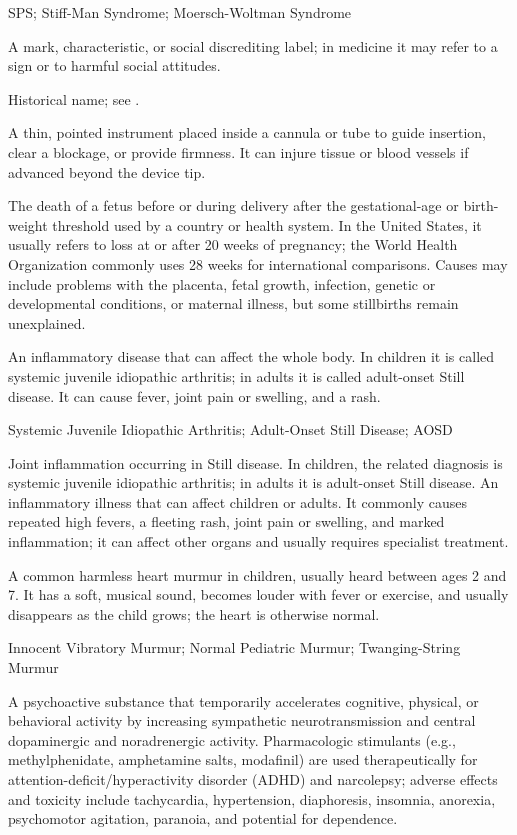 \synonyms
SPS; Stiff-Man Syndrome; Moersch-Woltman Syndrome

 A mark, characteristic, or social discrediting label; in medicine it may refer to a sign or to harmful social attitudes.

 Historical name; see .

 A thin, pointed instrument placed inside a cannula or tube to guide insertion, clear a blockage, or provide firmness. It can injure tissue or blood vessels if advanced beyond the device tip.

 The death of a fetus before or during delivery after the gestational-age or birth-weight threshold used by a country or health system. In the United States, it usually refers to loss at or after 20 weeks of pregnancy; the World Health Organization commonly uses 28 weeks for international comparisons. Causes may include problems with the placenta, fetal growth, infection, genetic or developmental conditions, or maternal illness, but some stillbirths remain unexplained.

 An inflammatory disease that can affect the whole body.
In children it is called systemic juvenile idiopathic arthritis; in adults it is called
adult-onset Still disease. It can cause fever, joint pain or swelling, and a rash.

\synonyms
Systemic Juvenile Idiopathic Arthritis; Adult-Onset Still Disease; AOSD

 Joint inflammation occurring in Still disease. In children, the related diagnosis is systemic juvenile idiopathic arthritis; in adults it is adult-onset Still disease.
 An inflammatory illness that can affect children or adults. It commonly causes repeated high fevers, a fleeting rash, joint pain or swelling, and marked inflammation; it can affect other organs and usually requires specialist treatment.

 A common harmless heart murmur in children, usually heard between ages 2 and 7. It has a soft, musical sound, becomes louder with fever or exercise, and usually disappears as the child grows; the heart is otherwise normal.

\synonyms
Innocent Vibratory Murmur; Normal Pediatric Murmur; Twanging-String Murmur

 A psychoactive substance that temporarily accelerates cognitive, physical, or behavioral activity by increasing sympathetic neurotransmission and central dopaminergic and noradrenergic activity. Pharmacologic stimulants (e.g., methylphenidate, amphetamine salts, modafinil) are used therapeutically for attention-deficit/hyperactivity disorder (ADHD) and narcolepsy; adverse effects and toxicity include tachycardia, hypertension, diaphoresis, insomnia, anorexia, psychomotor agitation, paranoia, and potential for dependence.

